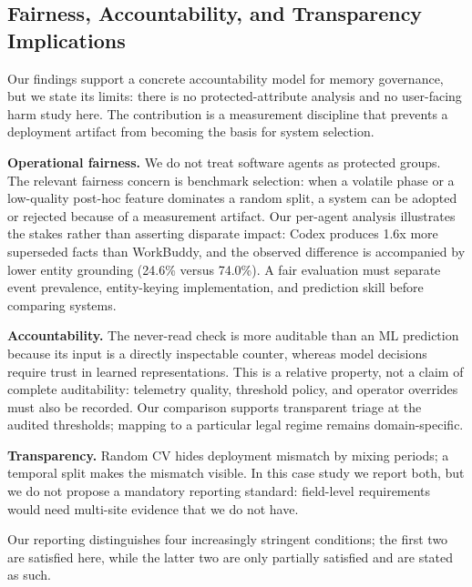 \documentclass[sigconf,nonacm]{acmart}
\begin{document}
\subsection{Fairness, Accountability, and Transparency Implications}
\label{sec:faacct-implications}

Our findings support a concrete accountability model for memory governance, but we state its limits: there is no protected-attribute analysis and no user-facing harm study here. The contribution is a measurement discipline that prevents a deployment artifact from becoming the basis for system selection.

\textbf{Operational fairness.} We do not treat software agents as protected groups. The relevant fairness concern is benchmark selection: when a volatile phase or a low-quality post-hoc feature dominates a random split, a system can be adopted or rejected because of a measurement artifact. Our per-agent analysis illustrates the stakes rather than asserting disparate impact: Codex produces 1.6x more superseded facts than WorkBuddy, and the observed difference is accompanied by lower entity grounding (24.6\% versus 74.0\%). A fair evaluation must separate event prevalence, entity-keying implementation, and prediction skill before comparing systems.

\textbf{Accountability.} The never-read check is more auditable than an ML prediction because its input is a directly inspectable counter, whereas model decisions require trust in learned representations. This is a relative property, not a claim of complete auditability: telemetry quality, threshold policy, and operator overrides must also be recorded. Our comparison supports transparent triage at the audited thresholds; mapping to a particular legal regime remains domain-specific.

\textbf{Transparency.} Random CV hides deployment mismatch by mixing periods; a temporal split makes the mismatch visible. In this case study we report both, but we do not propose a mandatory reporting standard: field-level requirements would need multi-site evidence that we do not have.

Our reporting distinguishes four increasingly stringent conditions; the first two are satisfied here, while the latter two are only partially satisfied and are stated as such.
\end{document}
